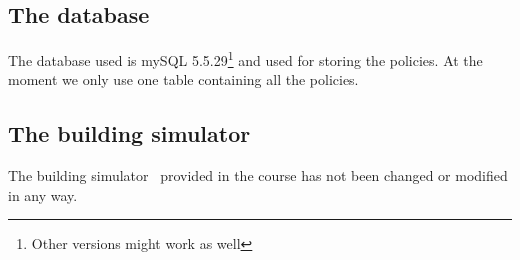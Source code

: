 \subsection{The database}
The database used is mySQL 5.5.29\footnote{Other versions might work as well} and used for storing the policies. At the moment we only use one table containing all the policies.

\subsection{The building simulator}
The building simulator~\cite{simulator} provided in the course has not been changed or modified in any way.